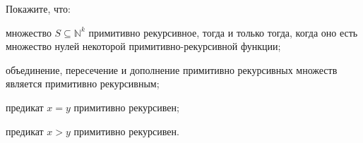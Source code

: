 Покажите, что:
\begin{enumcyr}
    \item множество $S \subseteq \mathbb{N}^k$ примитивно рекурсивное, тогда и только тогда, когда оно
        есть множество нулей некоторой примитивно-рекурсивной функции;
    \item объединение, пересечение и дополнение примитивно рекурсивных множеств является примитивно
        рекурсивным;
    \item предикат $x = y$ примитивно рекурсивен;
    \item предикат $x > y$ примитивно рекурсивен.
\end{enumcyr}